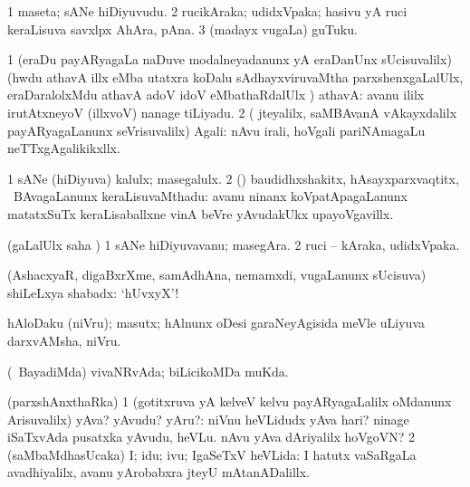 {{{{{{\bentry
{} 
\gl{\nA}
\expl{}
\bmng
\bnum
\num{1} maseta; sANe hiDiyuvudu. 
\num{2} rucikAraka; udidxVpaka; hasivu yA ruci keraLisuva savxlpx AhAra, pAna. 
\num{3} (madayx \mo vugaLa) guTuku. 
\enum
\emng
\eentry

\bentry
{} 
\gl{\saMavayx}
\expl{}
\bmng
\bnum
\num{1} (eraDu payARyagaLa naDuve modalneyadanunx yA eraDanUnx sUcisuvalilx)(hwdu athavA illx eMba utatxra koDalu sAdhayxviruvaMtha parxshenxgaLalUlx, eraDaralolxMdu athavA adoV idoV eMbathaRdalUlx \parx) athavA:  avanu ililx irutAtxneyoV (illxvoV) nanage tiLiyadu. 
\num{2} ( jteyalilx, saMBAvanA vAkayxdalilx payARyagaLanunx seVrisuvalilx) Agali:  nAvu irali, hoVgali pariNAmagaLu neTTxgAgalikikxllx. 
\enum
\emng

\noindent
\gl{\pagu}
\expl{}
\bmng
{} 
\emng
\eentry

\bentry
{}
\gl{\nA}
\expl{}
\bmng
\bnum
\num{1} sANe (hiDiyuva) kalulx; masegalulx. 
\num{2} (\rUpa) baudidhxshakitx, hAsayxparxvaqtitx, \mo\ BAvagaLanunx keraLisuvaMthadu:  avanu ninanx koVpatApagaLanunx matatxSuTx keraLisaballxne vinA beVre yAvudakUkx upayoVgavillx. 
\enum
\emng
\eentry

\bentry
{} 
\gl{\nA}
\expl{}
\bmng
(\saMpa gaLalUlx saha \parx) 
\bnum
\num{1} sANe hiDiyuvavanu; masegAra. 
\num{2} ruci -- kAraka, udidxVpaka. 
\enum
\emng
\eentry

\bentry
{} 
\gl{\BAavayx}
\expl{}
\bmng
(AshacxyaR, digaBxrXme, samAdhAna, nemamxdi, \mo vugaLanunx sUcisuva) shiLeLxya shabadx: `hUvxyX'! 
\emng
\eentry

\bentry
{} 
\gl{\nA}
\expl{}
\bmng
hAloDaku (niVru); masutx; hAlnunx oDesi garaNeyAgisida meVle uLiyuva darxvAMsha, niVru. 
\emng
\eentry

\bentry
{} 
\gl{\gu}
\expl{}
\bmng
(\kanmu\ BayadiMda) vivaNRvAda; biLicikoMDa muKda. 
\emng
\eentry

\bentry
{} 
\gl{\gu}
\expl{}
\bmng
(parxshAnxthaRka) 
\bnum
\num{1} (gotitxruva yA kelveV kelvu payARyagaLalilx oMdanunx Arisuvalilx) yAva? yAvudu? yAru?:  niVnu heVLidudx yAva hari?  ninage iSaTxvAda pusatxka yAvudu, heVLu.  nAvu yAva dAriyalilx hoVgoVN? 
\num{2} (saMbaMdhasUcaka) I; idu; ivu; IgaSeTxV heVLida:  I hatutx vaSaRgaLa avadhiyalilx, avanu yArobabxra jteyU mAtanADalillx. 
\enum
\emng
\eentry

}}}}}}
